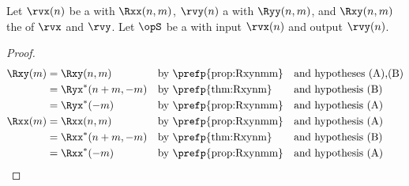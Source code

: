 \begin{corollary}
\label{cor:Rxxm}
\label{cor:Rxym}
Let $\rvx(n)$ be a  with  $\Rxx(n,m)$,
    $\rvy(n)$    a  with  $\Ryy(n,m)$,
and $\Rxy(n,m)$  the  of $\rvx$ and $\rvy$.
Let $\opS$ be a  with input $\rvx(n)$ and output $\rvy(n)$.
\end{corollary}
\begin{proof}
\begin{align*}
  \Rxy(m)
     &= \Rxy(n,m)
     && \text{by \prefp{prop:Rxynmm}}
     && \text{and hypotheses (A),(B)}
   \\&= \Ryx^\ast(n+m,-m)
     && \text{by \prefp{thm:Rxynm}}
     && \text{and hypothesis (B)}
   \\&= \Ryx^\ast(-m)
     && \text{by \prefp{prop:Rxynmm}}
     && \text{and hypothesis (A)}
   \\
  \Rxx(m)
     &= \Rxx(n,m)
     && \text{by \prefp{prop:Rxynmm}}
     && \text{and hypothesis (A)}
   \\&= \Rxx^\ast(n+m,-m)
     && \text{by \prefp{thm:Rxynm}}
     && \text{and hypothesis (B)}
   \\&= \Rxx^\ast(-m)
     && \text{by \prefp{prop:Rxynmm}}
     && \text{and hypothesis (A)}
\end{align*}
\end{proof}

